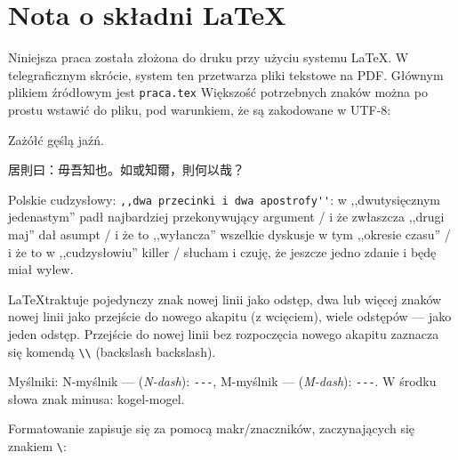 \section*{Nota o składni \LaTeX}
Niniejsza praca została złożona do druku przy użyciu systemu \LaTeX. W telegraficznym skrócie, system ten przetwarza pliki tekstowe na PDF. Głównym plikiem źródłowym jest \verb_praca.tex_ Większość potrzebnych znaków można po prostu wstawić do pliku, pod warunkiem, że są zakodowane w UTF-8:

Zażółć gęślą jaźń.

居則曰：毋吾知也。如或知爾，則何以哉？

Polskie cudzysłowy: \verb_,,dwa przecinki i dwa apostrofy''_: w ,,dwutysięcznym jedenastym'' padł najbardziej przekonywujący argument / i że zwłaszcza ,,drugi maj'' dał asumpt / i że to ,,wyłancza'' wszelkie dyskusje w tym ,,okresie czasu'' / i że to w ,,cudzysłowiu'' killer / słucham i czuję, że jeszcze jedno zdanie i będę miał wylew.

\LaTeX traktuje pojedynczy znak nowej linii jako odstęp, dwa lub więcej znaków nowej linii jako przejście do nowego akapitu (z wcięciem), wiele odstępów --- jako jeden odstęp. Przejście do nowej linii bez rozpoczęcia nowego akapitu zaznacza się komendą \verb_\\_ (backslash backslash).

Myślniki: N-myślnik --- (\textit{N-dash}): \verb_---_, M-myślnik --- (\textit{M-dash}): \verb_---_. W środku słowa znak minusa: kogel-mogel.

Formatowanie zapisuje się za pomocą makr/znaczników, zaczynających się znakiem \verb_\_:


